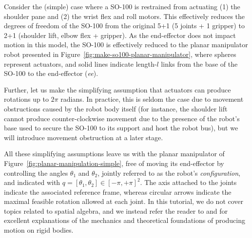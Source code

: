 Consider the (simple) case where a SO-100 is restrained from actuating (1) the shoulder pane and (2) the wrist flex and roll motors.
This effectively reduces the degrees of freedom of the SO-100 from the original 5+1 (5 joints + 1 gripper) to 2+1 (shoulder lift, elbow flex + gripper).
As the end-effector does not impact motion in this model, the SO-100 is effectively reduced to the planar manipulator robot presented in Figure~\ref{fig:make-so100-planar-manipulator}, where spheres represent actuators, and solid lines indicate length-\(l\) links from the base of the SO-100 to the end-effector (\emph{ee}).

Further, let us make the simplifying assumption that actuators can produce rotations up to \( 2 \pi \) radians.
In practice, this is seldom the case due to movement obstructions caused by the robot body itself (for instance, the shoulder lift cannot produce counter-clockwise movement due to the presence of the robot's base used to secure the SO-100 to its support and host the robot bus), but we will introduce movement obstruction at a later stage.

All these simplifying assumptions leave us with the planar manipulator of Figure~\ref{fig:planar-manipulation-simple}, free of moving its end-effector by controlling the angles \( \theta_1 \) and \( \theta_2 \), jointly referred to as the robot's \emph{configuration}, and indicated with \( q = [\theta_1, \theta_2 ] \in [-\pi, +\pi]^2 \).
The axis attached to the joints indicate the associated reference frame, whereas circular arrows indicate the maximal feasible rotation allowed at each joint. 
In this tutorial, we do not cover topics related to spatial algebra, and we instead refer the reader to \citet[Chapter~2]{lynchModernRoboticsMechanics2017} and \citet[Chapter~3]{tedrakeRoboticManipulationPerception} for excellent explanations of the mechanics and theoretical foundations of producing motion on rigid bodies.

\newcommand{\panelheight}{3.2cm}  %

